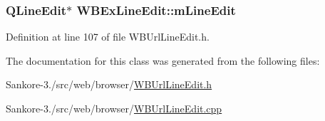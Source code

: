 \hypertarget{class_w_b_ex_line_edit_a43fd1d49e8339c475bbfbcce357b9ce5}{
\subsubsection[{m\-Line\-Edit}]{\setlength{\rightskip}{0pt plus 5cm}Q\-Line\-Edit$\ast$ W\-B\-Ex\-Line\-Edit\-::m\-Line\-Edit\hspace{0.3cm}{\ttfamily [protected]}}}\label{d6/dbb/class_w_b_ex_line_edit_a43fd1d49e8339c475bbfbcce357b9ce5}


Definition at line 107 of file W\-B\-Url\-Line\-Edit.\-h.



The documentation for this class was generated from the following files\-:\begin{DoxyCompactItemize}
\item 
Sankore-\/3./src/web/browser/\hyperlink{_w_b_url_line_edit_8h}{W\-B\-Url\-Line\-Edit.\-h}\item 
Sankore-\/3./src/web/browser/\hyperlink{_w_b_url_line_edit_8cpp}{W\-B\-Url\-Line\-Edit.\-cpp}\end{DoxyCompactItemize}
